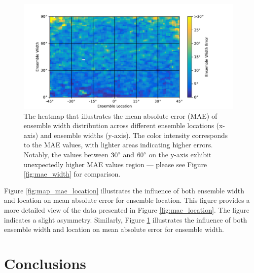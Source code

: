 \documentclass{article}
\begin{document}
\begin{figure}[!htb]
  \centering
  \includegraphics[width=\linewidth]{../figures/map_mae_width.pdf}
  \caption{\label{fig:map_mae_width}The heatmap that illustrates the mean absolute error (MAE) of ensemble width distribution across different ensemble locations (x-axis) and ensemble widths (y-axis). The color intensity corresponds to the MAE values, with lighter areas indicating higher errors. Notably, the values between $30\degree$ and $60\degree$ on the y-axis exhibit unexpectedly higher MAE values region --- please see Figure \ref{fig:mae_width} for comparison. }
\end{figure}

Figure \ref{fig:map_mae_location}  illustrates the influence of both ensemble width and location on mean absolute error for ensemble location. This figure provides a more detailed view of the data presented in Figure \ref{fig:mae_location}. The figure indicates a slight asymmetry. Similarly, Figure \ref{fig:map_mae_width} illustrates the influence of both ensemble width and location on mean absolute error for ensemble width.


\section{Conclusions}
\label{sec:conclusions}

\clearpage

\printbibliography
\end{document}

